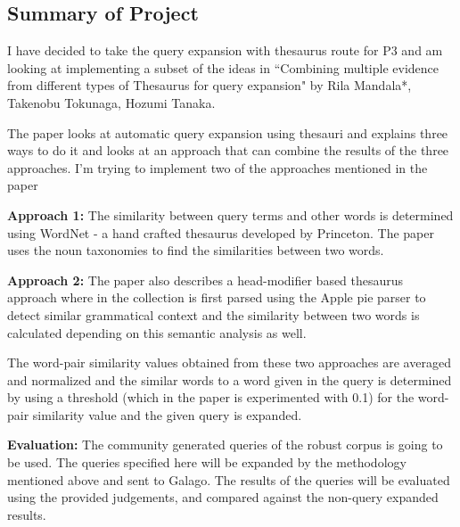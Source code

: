 \documentclass[12pt,letterpaper]{article}
\begin{document}
\subsection*{Summary of Project}
I have decided to take the query expansion with thesaurus route for P3
and am looking at implementing a subset of the ideas in ``Combining multiple evidence from different types of Thesaurus for query
expansion" by
Rila Mandala*, Takenobu Tokunaga, Hozumi Tanaka.\cite{paper}

The paper looks at automatic query expansion using thesauri and explains
three ways to do it and looks at an approach that can combine the
results of the three approaches. I'm trying to implement two of the approaches mentioned in the paper

\textbf{Approach 1:} The similarity between query terms and other words is
determined using WordNet - a hand crafted thesaurus developed by
Princeton. The paper uses the noun taxonomies to find the similarities
between two words.

\textbf{Approach 2:} The paper also describes a head-modifier based thesaurus
approach where in the collection is first parsed using the Apple pie
parser to detect similar grammatical context and the similarity between
two words is calculated depending on this semantic analysis as well.

The word-pair similarity values obtained from these two approaches are averaged and normalized and the similar words to a word given in the query is determined by using a threshold (which in the paper is experimented with 0.1) for the word-pair similarity value and the given query is expanded.

\textbf{Evaluation:}
The community generated queries of the robust corpus is going to be used. The queries specified here will be expanded by the methodology mentioned above and sent to Galago. The results of the queries will be evaluated using the provided judgements, and compared against the non-query expanded results.
\end{document}
